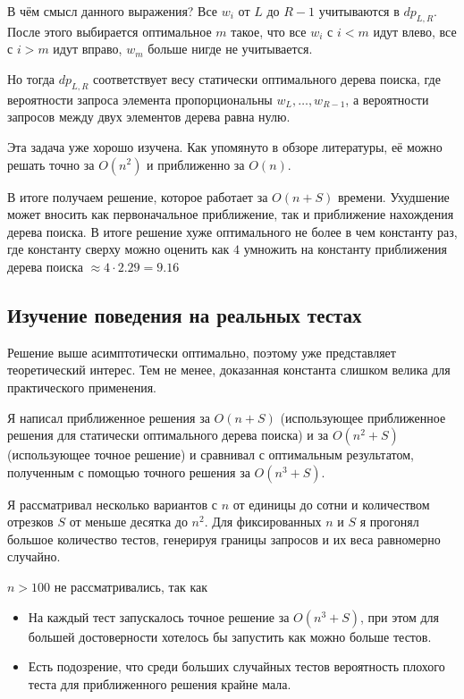 В чём смысл данного выражения? Все $w_i$ от $L$ до $R - 1$ учитываются в $dp_{L, R}$. После этого выбирается оптимальное $m$ такое, что все $w_i$ с $i < m$ идут влево, все с $i > m$ идут вправо, $w_m$ больше нигде не учитывается.

Но тогда $dp_{L, R}$ соответствует весу статически оптимального дерева поиска, где вероятности запроса элемента пропорциональны $w_L,\dots, w_{R-1}$, а вероятности запросов между двух элементов дерева равна нулю.

Эта задача уже хорошо изучена. Как упомянуто в обзоре литературы, её можно решать точно за $O(n^2)$ и приближенно за $O(n)$.

В итоге получаем решение, которое работает за $O(n + S)$ времени. Ухудшение может вносить как первоначальное приближение, так и приближение нахождения дерева поиска. В итоге решение хуже оптимального не более в чем константу раз, где константу сверху можно оценить как $4$ умножить на константу приближения дерева поиска $\approx 4 \cdot 2.29 = 9.16$

\subsection{Изучение поведения на реальных тестах}

Решение выше асимптотически оптимально, поэтому уже представляет теоретический интерес. Тем не менее, доказанная константа слишком велика для практического применения.

Я написал приближенное решения за $O(n + S)$ (использующее приближенное решения для статически оптимального дерева поиска) и за $O(n^2 + S)$ (использующее точное решение) и сравнивал с оптимальным результатом, полученным с помощью точного решения за $O(n^3 + S)$.

Я рассматривал несколько вариантов с $n$ от единицы до сотни и количеством отрезков $S$ от меньше десятка до $n^2$. Для фиксированных $n$ и $S$ я прогонял большое количество тестов, генерируя границы запросов и их веса равномерно случайно.

$n > 100$ не рассматривались, так как

\begin{itemize}
    \item На каждый тест запускалось точное решение за $O(n^3 + S)$, при этом для большей достоверности хотелось бы запустить как можно больше тестов.
    \item Есть подозрение, что среди больших случайных тестов вероятность плохого теста для приближенного решения крайне мала.
\end{itemize}

